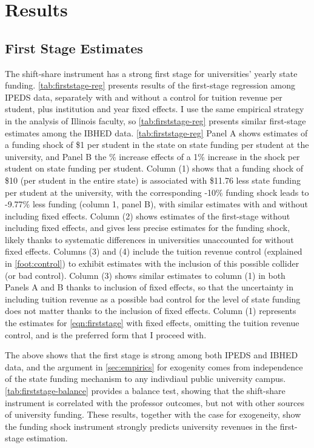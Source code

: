 \section{Results}
\label{sec:results}

\subsection{First Stage Estimates}
The shift-share instrument has a strong first stage for universities' yearly state funding.
\autoref{tab:firststage-reg} presents results of the first-stage regression among IPEDS data, separately with and without a control for tuition revenue per student, plus institution and year fixed effects.
I use the same empirical strategy in the analysis of Illinois faculty, so  \autoref{tab:firststage-reg} presents similar first-stage estimates among the IBHED data.
\autoref{tab:firststage-reg} Panel A shows estimates of a funding shock of \$1 per student in the state on state funding per student at the university, and Panel B the \% increase effects of a 1\% increase in the shock per student on state funding per student.
Column (1) shows that a funding shock of \$10 (per student in the entire state) is associated with \$11.76 less state funding per student at the university, with the corresponding -10\% funding shock leads to -9.77\%
less funding (column 1, panel B), with similar estimates with and without including fixed effects.
Column (2) shows estimates of the first-stage without including fixed effects, and gives less precise estimates for the funding shock, likely thanks to systematic differences in universities unaccounted for without fixed effects.
Columns (3) and (4) include the tuition revenue control (explained in \autoref{foot:control}) to exhibit estimates with the inclusion of this possible collider (or bad control).
Column (3) shows similar estimates to column (1) in both Panels A and B thanks to inclusion of fixed effects, so that the uncertainty in including tuition revenue as a possible bad control for the level of state funding does not matter thanks to the inclusion of fixed effects.
Column (1) represents the estimates for \autoref{eqn:firststage} with fixed effects, omitting the tuition revenue control, and is the preferred form that I proceed with.

The above shows that the first stage is strong among both IPEDS and IBHED data, and the argument in \autoref{sec:empirics} for exogenity comes from independence of the state funding mechanism to any indivdiaul public university campus.
\autoref{tab:firststage-balance} provides a balance test, showing that the shift-share instrument is correlated with the professor outcomes, but not with other sources of university funding.
These results, together with the case for exogeneity, show the funding shock instrument
strongly predicts university revenues in the first-stage estimation.

